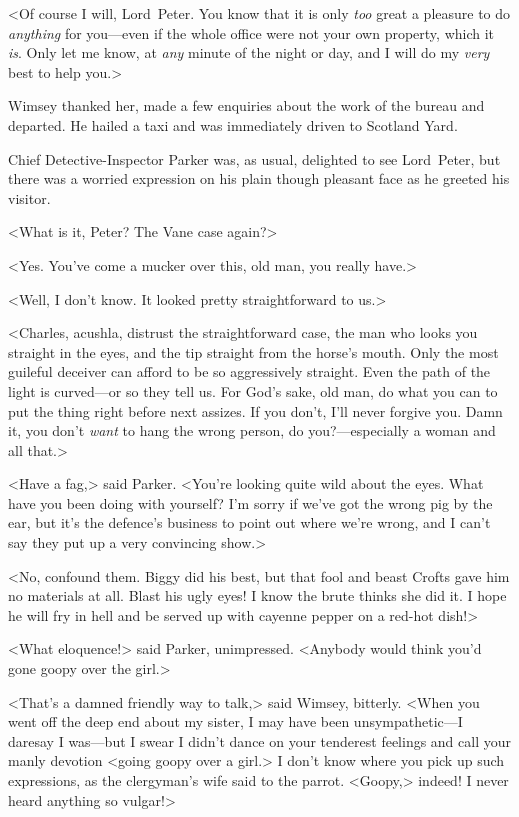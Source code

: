 <Of course I will, Lord~Peter. You know that it is only \emph{too} great a pleasure to do \emph{anything} for you—even if the whole office were not your own property, which it \emph{is}. Only let me know, at \emph{any} minute of the night or day, and I will do my \emph{very} best to help you.>

Wimsey thanked her, made a few enquiries about the work of the bureau and departed. He hailed a taxi and was immediately driven to Scotland Yard.

\divider

Chief Detective-Inspector Parker was, as usual, delighted to see Lord~Peter, but there was a worried expression on his plain though pleasant face as he greeted his visitor.

<What is it, Peter? The Vane case again?>

<Yes. You've come a mucker over this, old man, you really have.>

<Well, I don't know. It looked pretty straightforward to us.>

<Charles, acushla, distrust the straightforward case, the man who looks you straight in the eyes, and the tip straight from the horse's mouth. Only the most guileful deceiver can afford to be so aggressively straight. Even the path of the light is curved—or so they tell us. For God's sake, old man, do what you can to put the thing right before next assizes. If you don't, I'll never forgive you. Damn it, you don't \emph{want} to hang the wrong person, do you?—especially a woman and all that.>

<Have a fag,> said Parker. <You're looking quite wild about the eyes. What have you been doing with yourself? I'm sorry if we've got the wrong pig by the ear, but it's the defence's business to point out where we're wrong, and I can't say they put up a very convincing show.>

<No, confound them. Biggy did his best, but that fool and beast Crofts gave him no materials at all. Blast his ugly eyes! I know the brute thinks she did it. I hope he will fry in hell and be served up with cayenne pepper on a red-hot dish!>

<What eloquence!> said Parker, unimpressed. <Anybody would think you'd gone goopy over the girl.>

<That's a damned friendly way to talk,> said Wimsey, bitterly. <When you went off the deep end about my sister, I may have been unsympathetic—I daresay I was—but I swear I didn't dance on your tenderest feelings and call your manly devotion <going goopy over a girl.> I don't know where you pick up such expressions, as the clergyman's wife said to the parrot. <Goopy,> indeed! I never heard anything so vulgar!>

